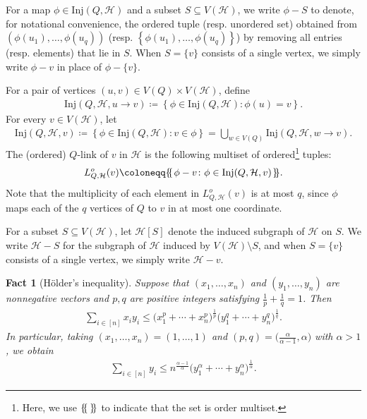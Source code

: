 \documentclass[11pt,a4paper]{article}
\newtheorem{fact}[definition]{Fact}
\newcommand{\multiset}[1]{\{\hspace{-0.25em}\{\hspace{0.1em}#1\hspace{0.1em}\}\hspace{-0.25em}\}}
\begin{document}
For a map $\phi \in \mathrm{Inj}(Q, \mathcal{H})$ and a subset $S\subseteq V(\mathcal{H})$, we write $\phi - S$ to denote, for notational convenience, the ordered tuple (resp. unordered set) obtained from $\left(\phi(u_1), \ldots, \phi(u_{q})\right)$ (resp. $\left\{\phi(u_1), \ldots, \phi(u_{q})\right\}$) by removing all entries (resp. elements) that lie in $S$. 
When $S = \{v\}$ consists of a single vertex, we simply write $\phi - v$ in place of $\phi - \{v\}$.

For a pair of vertices $(u, v) \in V(Q) \times V(\mathcal{H})$, define 
\begin{align*}
    \mathrm{Inj}(Q, \mathcal{H}, u \to v)
    \coloneqq \left\{  \phi \in \mathrm{Inj}(Q, \mathcal{H}) \colon \phi(u) = v \right\}.
\end{align*}
%
For every $v \in V(\mathcal{H})$, let 
\begin{align*}
    \mathrm{Inj}(Q, \mathcal{H}, v)
    \coloneqq \left\{ \phi \in \mathrm{Inj}(Q, \mathcal{H}) \colon v \in \phi \right\}
    = \bigcup_{w \in V(Q)} \mathrm{Inj}(Q, \mathcal{H}, w \to v).
\end{align*}
%
The (ordered) $Q$-link of $v$ in $\mathcal{H}$ is the following multiset of ordered\footnote{Here, we use $\multiset{}$ to indicate that the set is order multiset.} tuples:
\begin{align*}
    L_{Q, \mathcal{H}}^{o}(v)
    \coloneqq \multiset{\phi - v \colon  \phi \in \mathrm{Inj}(Q,\mathcal{H},v)}. 
\end{align*}
%
Note that the multiplicity of each element in $L_{Q, \mathcal{H}}^{o}(v)$ is at most $q$, since $\phi$ maps each of the $q$ vertices of $Q$ to $v$ in at most one coordinate.


For a subset $S \subseteq V(\mathcal{H})$, let $\mathcal{H}[S]$ denote the induced subgraph of $\mathcal{H}$ on $S$. 
We write $\mathcal{H} - S$ for the subgraph of $\mathcal{H}$ induced by $V(\mathcal{H}) \setminus S$, and when $S = \{v\}$ consists of a single vertex, we simply write $\mathcal{H} - v$.


\begin{fact}[H\"{o}lder's inequality]\label{FACT:Holder-Inequality}
    Suppose that $(x_1, \ldots, x_n)$ and $(y_1, \ldots, y_n)$ are nonnegative vectors and $p, q$ are positive integers satisfying $\frac{1}{p} + \frac{1}{q} = 1$. Then  
    \begin{align*}
        \sum_{i \in [n]} x_i y_i 
        \le \big(x_1^{p} + \cdots + x_{n}^{p} \big)^{\frac{1}{p}} \big( y_1^{q} + \cdots + y_n^{q} \big)^{\frac{1}{q}}. 
    \end{align*}
    In particular, taking $(x_1, \ldots, x_n) = (1,\ldots, 1)$ and $(p, q) = \big( \frac{\alpha}{\alpha-1} , \alpha\big)$ with $\alpha > 1$, we obtain 
    \begin{align*}
        \sum_{i \in [n]}  y_i 
        \le n^{\frac{\alpha-1}{\alpha}} \big( y_1^{\alpha} + \cdots + y_n^{\alpha} \big)^{\frac{1}{\alpha}}.  
    \end{align*}
\end{fact}
\end{document}
